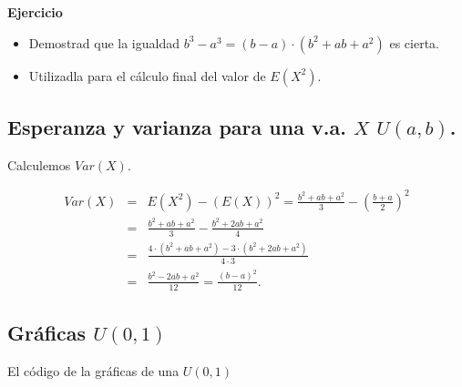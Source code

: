 \documentclass[]{book}
\begin{document}
\textbf{Ejercicio}

\begin{itemize}
\item
  Demostrad que la igualdad \(b^3-a^3=(b-a)\cdot (b^2+ab+a^2)\) es cierta.
\item
  Utilizadla para el cálculo final del valor de \(E(X^2)\).
\end{itemize}

\hypertarget{esperanza-y-varianza-para-una-v.a.-x-uab.}{%
\subsection{\texorpdfstring{Esperanza y varianza para una v.a. \(X\) \(U(a,b)\).}{Esperanza y varianza para una v.a. X U(a,b).}}\label{esperanza-y-varianza-para-una-v.a.-x-uab.}}

Calculemos \(Var(X)\).

\[
\begin{eqnarray*}
Var(X)&=&\displaystyle E(X^2)-(E(X))^2=\frac{b^2+ab+a^2}3-\left(\frac{b+a}2\right)^2\\&=&
\frac{b^2+ab+a^2}{3}-\frac{b^2+2ab+a^2}{4}\\
&=&
\frac{4\cdot (b^2+ab+a^2)-3\cdot (b^2+2ab+a^2)}{4\cdot 3}
\\
&=&
\frac{b^2-2ab+a^2}{12}=
\frac{(b-a)^2}{12}.
\end{eqnarray*}
\]

\hypertarget{gruxe1ficas-u01}{%
\subsection{\texorpdfstring{Gráficas \(U(0,1)\)}{Gráficas U(0,1)}}\label{gruxe1ficas-u01}}

El código de la gráficas de una \(U(0,1)\)
\end{document}
